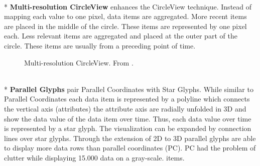 \\*
\textbf{Multi-resolution CircleView} enhances the CircleView technique. Instead of mapping each value to one pixel, data items are aggregated. More recent items are placed in the middle of the circle. These items are represented by one pixel each. Less relevant items are aggregated and placed at the outer part of the circle. These items are usually from a preceding point of time.
\begin{figure}[H]
    \centering
    \caption{Multi-resolution CircleView. From \cite{Keim2005}.}
    \label{fig:multiresolutioncircleview}
\end{figure}
\\*
\textbf{Parallel Glyphs} pair Parallel Coordinates with Star Glyphs. While similar to Parallel Coordinates each data item is represented by a polyline which connects the vertical axis (attributes) the attribute axis are radially unfolded in 3D and show the data value of the data item over time. Thus, each data value over time is represented by a star glyph. The visualization can be expanded by connection lines over star glyphs. Through the extension of 2D to 3D parallel glyphs are able to display more data rows than parallel coordinates (PC). PC had the problem of clutter while displaying 15.000 data on a gray-scale.  items\cite{Keimb}.
